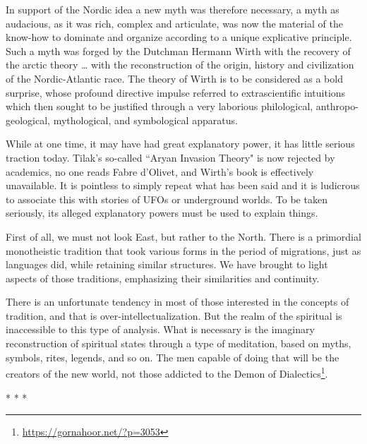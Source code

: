 \begin{quotex}
In support of the Nordic idea a new myth was therefore necessary, a myth as audacious, as it was rich, complex and articulate, was now the material of the know-how to dominate and organize according to a unique explicative principle. Such a myth was forged by the Dutchman Hermann Wirth with the recovery of the arctic theory … with the reconstruction of the origin, history and civilization of the Nordic-Atlantic race. The theory of Wirth is to be considered as a bold surprise, whose profound directive impulse referred to extrascientific intuitions which then sought to be justified through a very laborious philological, anthropo-geological, mythological, and symbological apparatus. 

\end{quotex}
While at one time, it may have had great explanatory power, it has little serious traction today. Tilak's so-called ``Aryan Invasion Theory" is now rejected by academics, no one reads Fabre d'Olivet, and Wirth's book is effectively unavailable. It is pointless to simply repeat what has been said and it is ludicrous to associate this with stories of UFOs or underground worlds. To be taken seriously, its alleged explanatory powers must be used to explain things.

First of all, we must not look East, but rather to the North. There is a primordial monotheistic tradition that took various forms in the period of migrations, just as languages did, while retaining similar structures. We have brought to light aspects of those traditions, emphasizing their similarities and continuity.

There is an unfortunate tendency in most of those interested in the concepts of tradition, and that is over-intellectualization. But the realm of the spiritual is inaccessible to this type of analysis. What is necessary is the imaginary reconstruction of spiritual states through a type of meditation, based on myths, symbols, rites, legends, and so on. The men capable of doing that will be the creators of the new world, not those addicted to the Demon of Dialectics\footnote{\url{https://gornahoor.net/?p=3053}}.




\begin{center}* * *\end{center}

